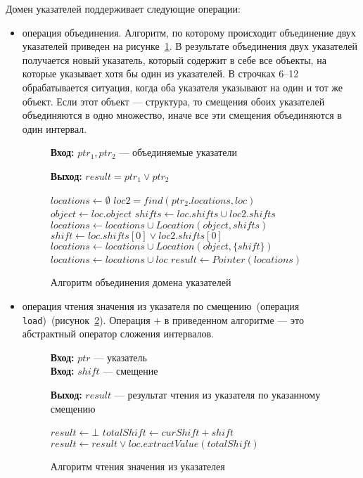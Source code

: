 Домен указателей поддерживает следующие операции:
\begin{itemize}
\item операция объединения. Алгоритм, по которому происходит объединение
двух указателей приведен на рисунке~\ref{image:ptrJoin}. В результате 
объединения двух указателей получается новый указатель, который содержит в 
себе все объекты, на которые указывает хотя бы один из указателей. В строчках 
6--12 обрабатывается ситуация, когда оба указателя указывают на один и тот 
же объект. Если этот объект --- структура, то смещения обоих указателей 
объединяются в одно множество, иначе все эти смещения объединяются в один 
интервал.
\begin{figure}[h!]
\textbf{Вход:} $ptr_1, ptr_2$ --- объединяемые указатели

\textbf{Выход:} $result = ptr_1 \vee ptr_2$

\begin{algorithmic}[1]
\State $locations \gets \emptyset$
    \State $loc2 = find(ptr_2.locations, loc)$
        \State $object \gets loc.object$
            \State $shifts \gets loc.shifts \cup loc2.shifts$
            \State $locations \gets locations \cup Location(object, shifts)$
        \Else
            \State $shift \gets loc.shifts[0] \vee loc2.shifts[0]$
            \State $locations \gets locations \cup Location(object, \{shift\})$
        \EndIf
    \Else
        \State $locations \gets locations \cup loc$
    \EndIf
\EndFor
\State $result \gets Pointer(locations)$
\end{algorithmic}
\caption{Алгоритм объединения домена указателей}
\label{image:ptrJoin}
\end{figure}

\item операция чтения значения из указателя по смещению~(операция 
\texttt{load})~(рисунок~\ref{image:ptrLoad}). Операция $+$ в приведенном
алгоритме --- это абстрактный оператор сложения интервалов.
\begin{figure}[h!]
\textbf{Вход:} $ptr$ --- указатель\\
\textbf{Вход:} $shift$ --- смещение

\textbf{Выход:} $result$ --- результат чтения из указателя по указанному 
смещению 

\begin{algorithmic}[1]
\State $result \gets \bot$
        \State $totalShift \gets curShift + shift$
        \State $result \gets result \vee loc.extractValue(totalShift)$
    \EndFor
\EndFor
\end{algorithmic}
\caption{Алгоритм чтения значения из указателея}
\label{image:ptrLoad}
\end{figure}


\end{itemize}
